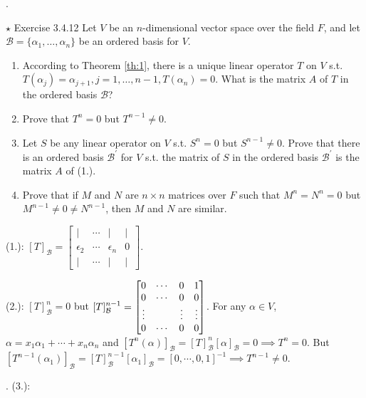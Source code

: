 \documentclass[8pt]{beamer}
\newcommand{\mc}[1]{\mathcal{#1}}
\begin{document}
\begin{frame}{.}
    \begin{block}{$\star$ Exercise 3.4.12}
        Let $V$ be an $n$-dimensional vector space over the field $F$, and let $\mc{B} = \{\alpha_1, \dots, \alpha_n\}$ be an ordered basis for $V$.
        \begin{enumerate}
            \item According to Theorem \ref{th:1}, there is a unique linear operator $T$ on $V$ s.t. $T(\alpha_j) = \alpha_{j+1}, j=1, \dots, n-1,T(\alpha_n) = 0$.
            What is the matrix $A$ of $T$ in the ordered basis $\mc{B}$?
            \item Prove that $T^n = 0$ but $T^{n-1} \neq 0$.
            \item Let $S$ be any linear operator on $V$ s.t. $S^n = 0$ but $S^{n-1} \neq 0$.
            Prove that there is an ordered basis $\mc{B}^\prime$ for $V$ s.t. the matrix of $S$ in the ordered basis $\mc{B}^\prime$ is the matrix $A$ of (1.).
            \item Prove that if $M$ and $N$ are $n \times n$ matrices over $F$ such that $M^n = N^n = 0$ but $M^{n-1} \neq 0 \neq N^{n-1}$, then $M$ and $N$ are similar.
        \end{enumerate}
    \end{block}
    (1.): $[T]_{\mc{B}} = \begin{bmatrix}
     | & \cdots &| & | \\ \epsilon_2 & \cdots &\epsilon_n & 0 \\ | & \cdots & | &|
    \end{bmatrix}$.

    (2.): $[T]^n_{\mc{B}} = 0$ but $[T]^{n-1}_{\mc{B}} = \begin{bmatrix}
        0 & \cdots & 0 & 1 \\ 0 & \cdots & 0 & 0 \\ \vdots & \empty & \vdots & \vdots \\ 0 & \cdots & 0 & 0
    \end{bmatrix}$.
    For any $\alpha \in V$, $\alpha = x_1 \alpha_1 + \cdots + x_n \alpha_n$ and $[T^n (\alpha)]_{\mc{B}} = [T]^n_{\mc{B}} [\alpha]_{\mc{B}} = 0 \implies T^n = 0$.
    But $[T^{n-1}(\alpha_1)]_{\mc{B}} = [T]^{n-1}_{\mc{B}} [\alpha_1]_{\mc{B}} = [0, \cdots, 0, 1]^{-1} \implies T^{n-1} \neq 0$.
\end{frame}

\begin{frame}{.}
    (3.):
\end{frame}
\end{document}
